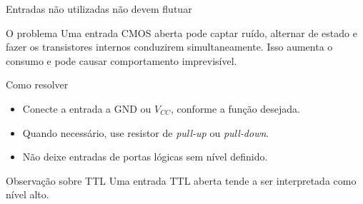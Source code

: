 \begin{frame}{Entradas não utilizadas não devem flutuar}
    \begin{block}{O problema}
        Uma entrada CMOS aberta pode captar ruído, alternar de estado e fazer os
        transistores internos conduzirem simultaneamente. Isso aumenta o consumo
        e pode causar comportamento imprevisível.
    \end{block}
    \begin{block}{Como resolver}
        \begin{itemize}
            \item Conecte a entrada a GND ou $V_{CC}$, conforme a função desejada.
            \item Quando necessário, use resistor de \textit{pull-up} ou
                  \textit{pull-down}.
            \item Não deixe entradas de portas lógicas sem nível definido.
        \end{itemize}
    \end{block}
    \begin{alertblock}{Observação sobre TTL}
        Uma entrada TTL aberta tende a ser interpretada como nível alto.
    \end{alertblock}
\end{frame}